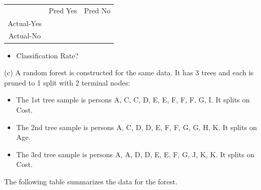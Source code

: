 \documentclass[
  letterpaper,
  DIV=11,
  numbers=noendperiod]{scrartcl}
\providecommand{\tightlist}{%
  \setlength{\itemsep}{0pt}\setlength{\parskip}{0pt}}\usepackage{longtable,booktabs,array}
\begin{document}
\begin{longtable}[]{@{}ccc@{}}
\toprule\noalign{}
\endhead
\bottomrule\noalign{}
\endlastfoot
& Pred Yes & Pred No \\
Actual-Yes & & \\
Actual-No & & \\
\end{longtable}

\begin{itemize}
\tightlist
\item
  Classification Rate?
\end{itemize}

(c) A random forest is constructed for the same data. It has 3 trees and
each is pruned to 1 split with 2 terminal nodes:

\begin{itemize}
\tightlist
\item
  The 1st tree sample is persons A, C, C, D, E, E, F, F, F, G, I. It
  splits on Cost.
\item
  The 2nd tree sample is persons A, C, D, D, E, F, F, G, G, H, K. It
  splits on Age.
\item
  The 3rd tree sample is persons A, A, D, D, E, E, F, G, J, K, K. It
  splits on Cost.
\end{itemize}

The following table summarizes the data for the forest.
\end{document}
